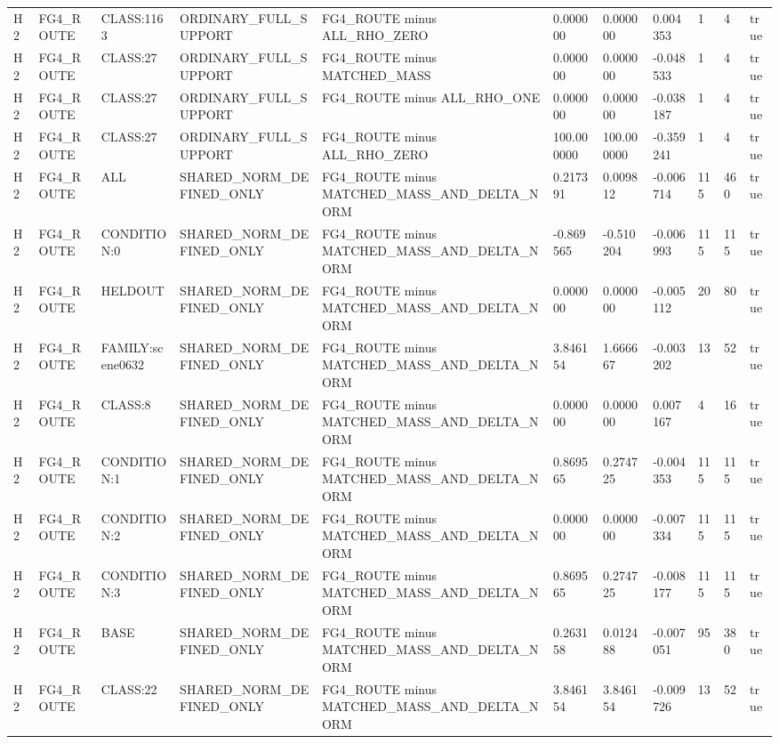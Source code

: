 \begin{tabular}{lllllllllll}
H2 & FG4\_ROUTE & CLASS:1163 & ORDINARY\_FULL\_SUPPORT & FG4\_ROUTE minus ALL\_RHO\_ZERO & 0.000000 & 0.000000 & 0.004353 & 1 & 4 & true \\
H2 & FG4\_ROUTE & CLASS:27 & ORDINARY\_FULL\_SUPPORT & FG4\_ROUTE minus MATCHED\_MASS & 0.000000 & 0.000000 & -0.048533 & 1 & 4 & true \\
H2 & FG4\_ROUTE & CLASS:27 & ORDINARY\_FULL\_SUPPORT & FG4\_ROUTE minus ALL\_RHO\_ONE & 0.000000 & 0.000000 & -0.038187 & 1 & 4 & true \\
H2 & FG4\_ROUTE & CLASS:27 & ORDINARY\_FULL\_SUPPORT & FG4\_ROUTE minus ALL\_RHO\_ZERO & 100.000000 & 100.000000 & -0.359241 & 1 & 4 & true \\
H2 & FG4\_ROUTE & ALL & SHARED\_NORM\_DEFINED\_ONLY & FG4\_ROUTE minus MATCHED\_MASS\_AND\_DELTA\_NORM & 0.217391 & 0.009812 & -0.006714 & 115 & 460 & true \\
H2 & FG4\_ROUTE & CONDITION:0 & SHARED\_NORM\_DEFINED\_ONLY & FG4\_ROUTE minus MATCHED\_MASS\_AND\_DELTA\_NORM & -0.869565 & -0.510204 & -0.006993 & 115 & 115 & true \\
H2 & FG4\_ROUTE & HELDOUT & SHARED\_NORM\_DEFINED\_ONLY & FG4\_ROUTE minus MATCHED\_MASS\_AND\_DELTA\_NORM & 0.000000 & 0.000000 & -0.005112 & 20 & 80 & true \\
H2 & FG4\_ROUTE & FAMILY:scene0632 & SHARED\_NORM\_DEFINED\_ONLY & FG4\_ROUTE minus MATCHED\_MASS\_AND\_DELTA\_NORM & 3.846154 & 1.666667 & -0.003202 & 13 & 52 & true \\
H2 & FG4\_ROUTE & CLASS:8 & SHARED\_NORM\_DEFINED\_ONLY & FG4\_ROUTE minus MATCHED\_MASS\_AND\_DELTA\_NORM & 0.000000 & 0.000000 & 0.007167 & 4 & 16 & true \\
H2 & FG4\_ROUTE & CONDITION:1 & SHARED\_NORM\_DEFINED\_ONLY & FG4\_ROUTE minus MATCHED\_MASS\_AND\_DELTA\_NORM & 0.869565 & 0.274725 & -0.004353 & 115 & 115 & true \\
H2 & FG4\_ROUTE & CONDITION:2 & SHARED\_NORM\_DEFINED\_ONLY & FG4\_ROUTE minus MATCHED\_MASS\_AND\_DELTA\_NORM & 0.000000 & 0.000000 & -0.007334 & 115 & 115 & true \\
H2 & FG4\_ROUTE & CONDITION:3 & SHARED\_NORM\_DEFINED\_ONLY & FG4\_ROUTE minus MATCHED\_MASS\_AND\_DELTA\_NORM & 0.869565 & 0.274725 & -0.008177 & 115 & 115 & true \\
H2 & FG4\_ROUTE & BASE & SHARED\_NORM\_DEFINED\_ONLY & FG4\_ROUTE minus MATCHED\_MASS\_AND\_DELTA\_NORM & 0.263158 & 0.012488 & -0.007051 & 95 & 380 & true \\
H2 & FG4\_ROUTE & CLASS:22 & SHARED\_NORM\_DEFINED\_ONLY & FG4\_ROUTE minus MATCHED\_MASS\_AND\_DELTA\_NORM & 3.846154 & 3.846154 & -0.009726 & 13 & 52 & true \\

\end{tabular}
